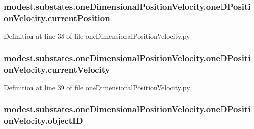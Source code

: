 \subsubsection[{\texorpdfstring{current\+Position}{currentPosition}}]{\setlength{\rightskip}{0pt plus 5cm}modest.\+substates.\+one\+Dimensional\+Position\+Velocity.\+one\+D\+Position\+Velocity.\+current\+Position}\hypertarget{classmodest_1_1substates_1_1oneDimensionalPositionVelocity_1_1oneDPositionVelocity_a11e9f155c003f833abc8dd013a04588d}{}\label{classmodest_1_1substates_1_1oneDimensionalPositionVelocity_1_1oneDPositionVelocity_a11e9f155c003f833abc8dd013a04588d}


Definition at line 38 of file one\+Dimensional\+Position\+Velocity.\+py.

\subsubsection[{\texorpdfstring{current\+Velocity}{currentVelocity}}]{\setlength{\rightskip}{0pt plus 5cm}modest.\+substates.\+one\+Dimensional\+Position\+Velocity.\+one\+D\+Position\+Velocity.\+current\+Velocity}\hypertarget{classmodest_1_1substates_1_1oneDimensionalPositionVelocity_1_1oneDPositionVelocity_a111816573a8073e5c0d9d04754480592}{}\label{classmodest_1_1substates_1_1oneDimensionalPositionVelocity_1_1oneDPositionVelocity_a111816573a8073e5c0d9d04754480592}


Definition at line 39 of file one\+Dimensional\+Position\+Velocity.\+py.

\subsubsection[{\texorpdfstring{object\+ID}{objectID}}]{\setlength{\rightskip}{0pt plus 5cm}modest.\+substates.\+one\+Dimensional\+Position\+Velocity.\+one\+D\+Position\+Velocity.\+object\+ID}\hypertarget{classmodest_1_1substates_1_1oneDimensionalPositionVelocity_1_1oneDPositionVelocity_a805e7dfe302ac83ca52c1b15b171b93e}{}\label{classmodest_1_1substates_1_1oneDimensionalPositionVelocity_1_1oneDPositionVelocity_a805e7dfe302ac83ca52c1b15b171b93e}


